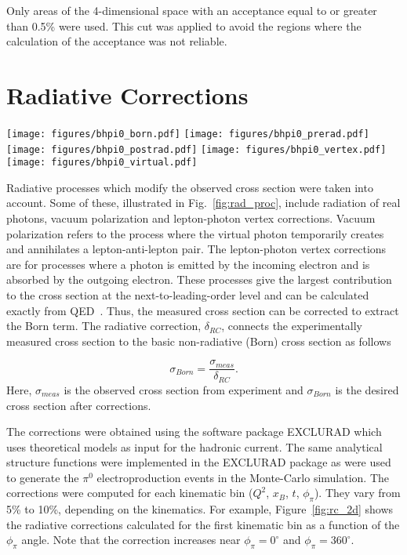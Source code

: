 \documentclass[prc,floatfix,twocolumn,superscriptaddress,letter]{revtex4}
\begin{document}
Only areas of the 4-dimensional space with an acceptance equal to or greater than 0.5\% were used.
This cut was applied to avoid the regions where the calculation of the acceptance was not reliable. 


\section{Radiative Corrections}\label{sim:radcor}
\begin{figure*}
\texttt{[image: figures/bhpi0\_born.pdf]}
\texttt{[image: figures/bhpi0\_prerad.pdf]}
\texttt{[image: figures/bhpi0\_postrad.pdf]}
\texttt{[image: figures/bhpi0\_vertex.pdf]}
\texttt{[image: figures/bhpi0\_virtual.pdf]}
\caption{\label{fig:rad_proc}	
Feynman diagrams contributing to the pion electroproduction
cross section. Left to right: Born process,
Brehmsstrahlung (by the initial and the final electron),  vertex correction, and
vacuum polarization.
}
\end{figure*}
Radiative processes which modify the observed cross section were taken into account. Some of these, illustrated in Fig.~\ref{fig:rad_proc},  include radiation of real photons, vacuum polarization and lepton-photon vertex corrections. Vacuum polarization refers
to the process where the virtual photon temporarily creates and annihilates
a lepton-anti-lepton pair. The lepton-photon vertex corrections are for
processes where a photon is emitted by the incoming electron and is absorbed
by the outgoing electron. These processes
give the largest contribution to the cross section at the next-to-leading-order level 
and can be calculated exactly from QED~\cite{exclurad}.  Thus, the measured cross section can be corrected to extract the Born term.
The  radiative correction, $\delta_{RC}$, connects the experimentally measured cross section to the basic non-radiative (Born) cross section as follows

\begin{equation}
	\sigma_{Born} = \frac{\sigma_{meas}}{\delta_{RC}}.
\end{equation}
Here, $\sigma_{meas}$ is the observed cross section from experiment and 
$\sigma_{Born}$ is the desired cross section after corrections.


The corrections were obtained using the software package EXCLURAD \cite{exclurad}
which uses  theoretical models as input for the hadronic current. 
The same  analytical structure functions were implemented  in the EXCLURAD package as were used to generate  the $\pi^0$  electroproduction events in the Monte-Carlo simulation. 
The corrections were computed for each kinematic bin  ($Q^2$, $x_B$, $t$, $\phi_\pi$). 
They vary from 5\% to 10\%, depending on the kinematics.
For example, Figure~\ref{fig:rc_2d} shows the radiative corrections calculated 
for the first kinematic bin
as a function of the $\phi_\pi$ angle. 
Note that the correction increases near  
$\phi_\pi=0^\circ$ and $\phi_\pi=360^\circ$. 
\end{document}
